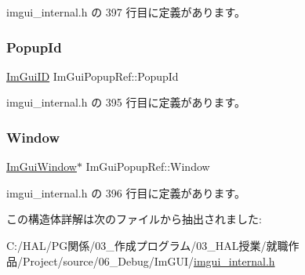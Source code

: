 imgui\+\_\+internal.\+h の 397 行目に定義があります。

\mbox{\label{struct_im_gui_popup_ref_a7037780575e28439414d28625a495bad}} 
\subsubsection{\texorpdfstring{Popup\+Id}{PopupId}}
{\footnotesize\ttfamily \mbox{\hyperlink{imgui_8h_a1785c9b6f4e16406764a85f32582236f}{Im\+Gui\+ID}} Im\+Gui\+Popup\+Ref\+::\+Popup\+Id}



 imgui\+\_\+internal.\+h の 395 行目に定義があります。

\mbox{\label{struct_im_gui_popup_ref_a471027209038d1d59280a84c8d236f34}} 
\subsubsection{\texorpdfstring{Window}{Window}}
{\footnotesize\ttfamily \mbox{\hyperlink{struct_im_gui_window}{Im\+Gui\+Window}}$\ast$ Im\+Gui\+Popup\+Ref\+::\+Window}



 imgui\+\_\+internal.\+h の 396 行目に定義があります。



この構造体詳解は次のファイルから抽出されました\+:\begin{DoxyCompactItemize}
\item 
C\+:/\+H\+A\+L/\+P\+G関係/03\+\_\+作成プログラム/03\+\_\+\+H\+A\+L授業/就職作品/\+Project/source/06\+\_\+\+Debug/\+Im\+G\+U\+I/\mbox{\hyperlink{imgui__internal_8h}{imgui\+\_\+internal.\+h}}\end{DoxyCompactItemize}

